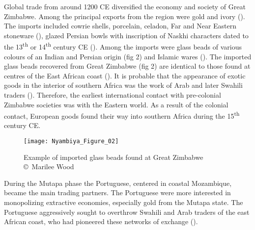 Global trade from around 1200 CE diversified the economy and society of Great Zimbabwe.  Among the principal exports from the region were gold and ivory (\cites{mudenge1988}{pwiti2005}{pikirayi2006}). The imports included cowrie shells, porcelain, celadon, Far and Near Eastern stoneware (\cites{garlake1973}{garlake1982}{pikirayi2006}), glazed Persian bowls with inscription of Naskhi characters dated to the 13\textsuperscript{th} or 14\textsuperscript{th} century CE (\cites{garlake1973}). Among the imports were glass beads of various colours of an Indian and Persian origin (fig 2) and Islamic wares (\cites{huffman1972}{huffman2000}{kim2008}{chirikure2008}). The imported glass beads recovered from Great Zimbabwe (fig 2) are identical to those found at centres of the East African coast (\cites{chirikure2008}{kusimba2017}). It is probable that the appearance of exotic goods in the interior of southern
Africa was the work of Arab and later Swahili traders (\cites{kusimba1999}[][22]{ndoro2001}).
Therefore, the earliest international contact with pre-colonial Zimbabwe societies was with the Eastern world. As a result of the colonial contact, European goods found their way into southern Africa during the 15\textsuperscript{th} century CE.

\begin{figure}[!tb]
	\texttt{[image: Nyambiya\_Figure\_02]}
	\caption{Example of imported glass beads found at Great Zimbabwe
		{\normalfont\scriptsize \\ \copyright\ Marilee Wood
	}}
	\label{fig:Nyambiya_Figure_02}
\end{figure}

During the  Mutapa phase the Portuguese, centered in coastal Mozambique, became the main trading partners. The Portuguese were more interested in monopolizing extractive economies, especially gold from the Mutapa state. The Portuguese aggressively sought to overthrow Swahili and Arab traders of the east African coast, who had pioneered these networks of
exchange (\cites{sinclair1987}{kusimba1999}{pwiti2005}).

